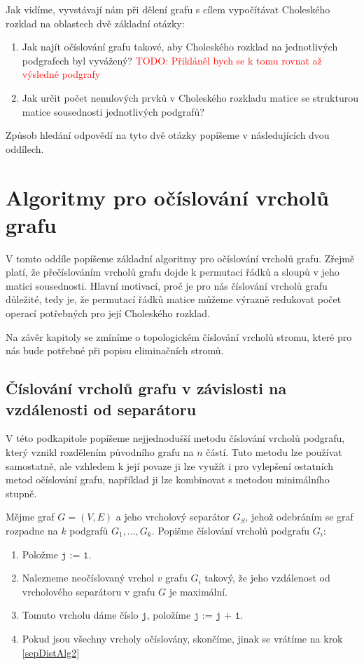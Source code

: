 \documentclass[11pt,american,czech,oneside]{book}
\theoremstyle{plain}
\theoremstyle{definition}
\newcommand{\TODO}[1]{\textcolor{red}{TODO: #1}}
\begin{document}
\medskip
Jak vidíme, vyvstávají nám při dělení grafu s cílem vypočítávat Choleského rozklad na oblastech dvě základní otázky:
\begin{enumerate}
  \item Jak najít očíslování grafu takové, aby Choleského rozklad na jednotlivých podgrafech byl vyvážený? \TODO{Přikláněl bych se k tomu rovnat až výsledné podgrafy}
  \item Jak určit počet nenulových prvků v Choleského rozkladu matice se strukturou matice sousednosti jednotlivých podgrafů?
\end{enumerate}
Způsob hledání odpovědí na tyto dvě otázky popíšeme v následujících dvou oddílech.

\section{Algoritmy pro očíslování vrcholů grafu}
\label{Numbering}
V tomto oddíle popíšeme základní algoritmy pro očíslování vrcholů grafu. Zřejmě platí, že přečíslováním vrcholů grafu dojde k permutaci řádků a sloupů v jeho matici sousednosti. Hlavní motivací, proč je pro nás číslování vrcholů grafu důležité, tedy je, že permutací řádků matice můžeme výrazně redukovat počet operací potřebných pro její Choleského rozklad.

Na závěr kapitoly se zmíníme o topologickém číslování vrcholů stromu, které pro nás bude potřebné při popisu eliminačních stromů.

\subsection{Číslování vrcholů grafu v závislosti na vzdálenosti od separátoru}
\label{sepDistOrdering}

V této podkapitole popíšeme nejjednodušší metodu číslování vrcholů podgrafu, který vznikl rozdělením původního grafu na $n$ částí.
Tuto metodu lze používat samostatně, ale vzhledem k její povaze ji lze využít i pro vylepšení ostatních metod očíslování grafu,
například ji lze kombinovat s metodou minimálního stupně.

Mějme graf $G = (V,E)$ a jeho vrcholový separátor $G_S$, jehož odebráním se graf rozpadne na $k$ podgrafů $G_1, \ldots, G_k$.
Popišme číslování vrcholů podgrafu $G_i$:

\begin{enumerate}
  \item Položme $\texttt{j := 1}$.
  \item \label{sepDistAlg2} Nalezneme neočíslovaný vrchol $v$ grafu $G_i$ takový, že jeho vzdálenost od vrcholového separátoru v grafu $G$ je maximální.
  \item Tomuto vrcholu dáme číslo $\texttt{j}$, položíme $\texttt{j := j + 1}$.
  \item Pokud jsou všechny vrcholy očíslovány, skončíme, jinak se vrátíme na krok \ref{sepDistAlg2}
\end{enumerate}
\end{document}
